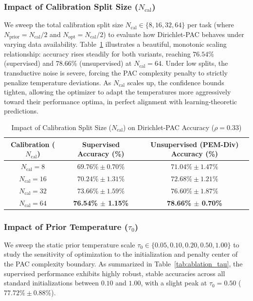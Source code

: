 \subsubsection{Impact of Calibration Split Size ($N_{\text{cal}}$)}
We sweep the total calibration split size $N_{\text{cal}} \in \{8, 16, 32, 64\}$ per task (where $N_{\text{prior}} = N_{\text{cal}}/2$ and $N_{\text{opt}} = N_{\text{cal}}/2$) to evaluate how Dirichlet-PAC behaves under varying data availability. Table~\ref{tab:ablation_N} illustrates a beautiful, monotonic scaling relationship: accuracy rises steadily for both variants, reaching $76.54\%$ (supervised) and $78.66\%$ (unsupervised) at $N_{\text{cal}}=64$. Under low splits, the transductive noise is severe, forcing the PAC complexity penalty to strictly penalize temperature deviations. As $N_{\text{cal}}$ scales up, the confidence bounds tighten, allowing the optimizer to adapt the temperatures more aggressively toward their performance optima, in perfect alignment with learning-theoretic predictions.

\begin{table}[h]
\centering
\caption{Impact of Calibration Split Size ($N_{\text{cal}}$) on Dirichlet-PAC Accuracy ($\rho=0.33$)}
\label{tab:ablation_N}
\vskip 0.15in
\begin{tabular}{ccc}
\toprule
\textbf{Calibration ($N_{\text{cal}}$)} & \textbf{Supervised Accuracy (\%)} & \textbf{Unsupervised (PEM-Div) Accuracy (\%)} \\
\midrule
$N_{\text{cal}} = 8$ & $69.76\% \pm 0.70\%$ & $71.04\% \pm 1.47\%$ \\
$N_{\text{cal}} = 16$ & $70.24\% \pm 1.31\%$ & $72.68\% \pm 1.21\%$ \\
$N_{\text{cal}} = 32$ & $73.66\% \pm 1.59\%$ & $76.60\% \pm 1.87\%$ \\
$N_{\text{cal}} = 64$ & \textbf{76.54\% $\pm$ 1.15\%} & \textbf{78.66\% $\pm$ 0.70\%} \\
\bottomrule
\end{tabular}
\end{table}

\subsubsection{Impact of Prior Temperature ($\tau_0$)}
We sweep the static prior temperature scale $\tau_0 \in \{0.05, 0.10, 0.20, 0.50, 1.00\}$ to study the sensitivity of optimization to the initialization and penalty center of the PAC complexity boundary. As summarized in Table~\ref{tab:ablation_tau}, the supervised performance exhibits highly robust, stable accuracies across all standard initializations between $0.10$ and $1.00$, with a slight peak at $\tau_0 = 0.50$ ($77.72\% \pm 0.88\%$). 

